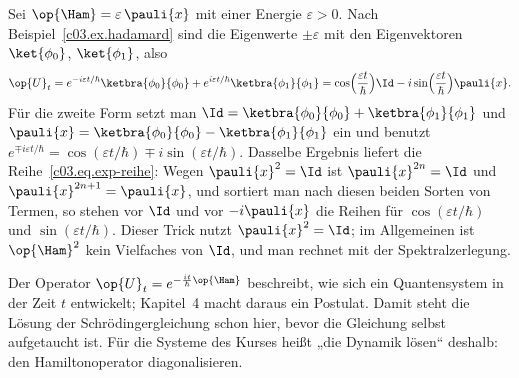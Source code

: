 \begin{example}\label{c03.ex.qubit-zeit}
  Sei $\op{\Ham} = \varepsilon\, \pauli{x}$ mit einer Energie $\varepsilon > 0$. Nach
  Beispiel~\ref{c03.ex.hadamard} sind die Eigenwerte $\pm\varepsilon$ mit den Eigenvektoren
  $\ket{\phi_0}$, $\ket{\phi_1}$, also
  \begin{equation}\label{c03.eq.qubit-zeit}
    \op{U}_t
    = e^{-i\varepsilon t/\hbar}\ketbra{\phi_0}{\phi_0} + e^{i\varepsilon t/\hbar}\ketbra{\phi_1}{\phi_1}
    = \cos\Bigl(\frac{\varepsilon t}{\hbar}\Bigr) \Id - i \sin\Bigl(\frac{\varepsilon t}{\hbar}\Bigr) \pauli{x} .
  \end{equation}
  Für die zweite Form setzt man $\Id = \ketbra{\phi_0}{\phi_0} + \ketbra{\phi_1}{\phi_1}$ und
  $\pauli{x} = \ketbra{\phi_0}{\phi_0} - \ketbra{\phi_1}{\phi_1}$ ein und benutzt
  $e^{\mp i\varepsilon t/\hbar} = \cos(\varepsilon t/\hbar) \mp i\sin(\varepsilon t/\hbar)$. Dasselbe Ergebnis liefert die
  Reihe~\eqref{c03.eq.exp-reihe}: Wegen $\pauli{x}^2 = \Id$ ist $\pauli{x}^{2n} = \Id$ und
  $\pauli{x}^{2n+1} = \pauli{x}$, und sortiert man nach diesen beiden Sorten von Termen, so stehen
  vor $\Id$ und vor $-i\pauli{x}$ die Reihen für $\cos(\varepsilon t/\hbar)$ und $\sin(\varepsilon t/\hbar)$. Dieser
  Trick nutzt $\pauli{x}^2 = \Id$; im Allgemeinen ist $\op{\Ham}^2$ kein Vielfaches von $\Id$, und
  man rechnet mit der Spektralzerlegung.
\end{example}

\begin{merksatz}[Zeitentwicklung]
  Der Operator $\op{U}_t = e^{-\frac{i t}{\hbar}\op{\Ham}}$ beschreibt, wie sich ein
  Quantensystem in der Zeit $t$ entwickelt; Kapitel~4 macht daraus ein Postulat. Damit steht die
  Lösung der Schrödingergleichung schon hier, bevor die Gleichung selbst aufgetaucht ist. Für die
  Systeme des Kurses heißt „die Dynamik lösen“ deshalb: den Hamiltonoperator diagonalisieren.
\end{merksatz}

